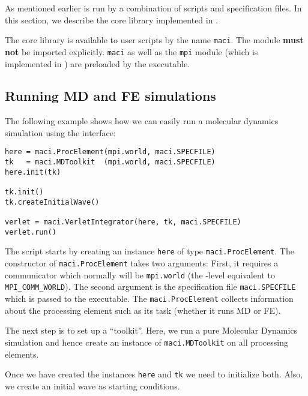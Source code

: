 
As mentioned earlier \MACI is run by a combination of \PYTHON scripts and \XML specification files. In this section, we describe the \MACI core library implemented in \PYTHON.\newline

The \MACI core library is available to user scripts by the name \lstinline[style=SHELL]|maci|. The module \textbf{must not} be imported explicitly.  \lstinline[style=SHELL]|maci| as well as the \lstinline[style=SHELL]|mpi| module (which is implemented in \WMPI) are preloaded by the \MACI executable. 

\subsection{Running MD and FE simulations}

The following example shows how we can easily run a molecular dynamics simulation using the \MACI interface:

\begin{lstlisting}[style=PYTHON_SMALL,frame=lines]
here = maci.ProcElement(mpi.world, maci.SPECFILE)
tk   = maci.MDToolkit  (mpi.world, maci.SPECFILE)
here.init(tk)

tk.init()
tk.createInitialWave()

verlet = maci.VerletIntegrator(here, tk, maci.SPECFILE)
verlet.run()
\end{lstlisting}

The script starts by creating an instance \lstinline[style=PYTHON]|here| of type \lstinline[style=PYTHON]|maci.ProcElement|. The constructor of \lstinline[style=PYTHON]|maci.ProcElement| takes two arguments: First, it requires a communicator which normally will be \lstinline[style=PYTHON]|mpi.world| (the \PYTHON-level equivalent to \lstinline[style=CODE]|MPI_COMM_WORLD|). The second argument is the specification file \lstinline[style=PYTHON]|maci.SPECFILE| which is passed to the executable. The \lstinline[style=PYTHON]|maci.ProcElement| collects information about the processing element such as its task (whether it runs MD or FE).

The next step is to set up a ``toolkit''. Here, we run a pure Molecular Dynamics simulation and hence create an instance of \lstinline[style=PYTHON]|maci.MDToolkit| on all processing elements. 

Once we have created the instances \lstinline[style=PYTHON]|here| and \lstinline[style=PYTHON]|tk| we need to initialize both. Also, we create an initial wave as starting conditions. 

